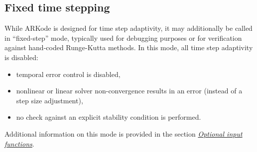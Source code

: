 \documentclass[letterpaper,10pt,english]{sphinxmanual}
\begin{document}
\subsection{Fixed time stepping}
\label{Mathematics:mathematics-fixedstep}\label{Mathematics:fixed-time-stepping}
While ARKode is designed for time step adaptivity, it may additionally
be called in ``fixed-step'' mode, typically used for debugging purposes
or for verification against hand-coded Runge-Kutta methods.  In this
mode, all time step adaptivity is disabled:
\begin{itemize}
\item {} 
temporal error control is disabled,

\item {} 
nonlinear or linear solver non-convergence results in an error
(instead of a step size adjustment),

\item {} 
no check against an explicit stability condition is performed.

\end{itemize}

Additional information on this mode is provided in the section
{\hyperref[c_interface/User_callable:cinterface-optionalinputs]{\emph{Optional input functions}}}.
\end{document}
